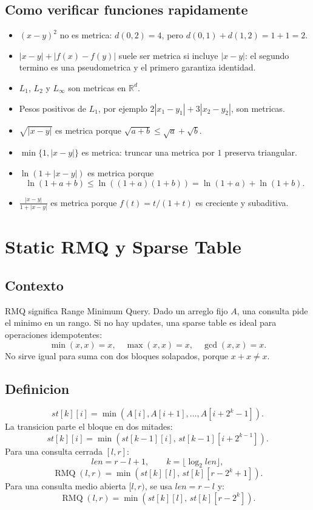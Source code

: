 \documentclass[10pt]{article}
\newcommand{\RMQ}{\operatorname{RMQ}}
\begin{document}
\subsection{Como verificar funciones rapidamente}
\begin{itemize}
\item \((x-y)^2\) no es metrica: \(d(0,2)=4\), pero \(d(0,1)+d(1,2)=1+1=2\).
\item \(|x-y|+|f(x)-f(y)|\) suele ser metrica si incluye \(|x-y|\): el segundo termino es una pseudometrica y
el primero garantiza identidad.
\item \(L_1\), \(L_2\) y \(L_\infty\) son metricas en \(\mathbb{R}^d\).
\item Pesos positivos de \(L_1\), por ejemplo \(2|x_1-y_1|+3|x_2-y_2|\), son metricas.
\item \(\sqrt{|x-y|}\) es metrica porque \(\sqrt{a+b}\le \sqrt a+\sqrt b\).
\item \(\min\{1,|x-y|\}\) es metrica: truncar una metrica por \(1\) preserva triangular.
\item \(\ln(1+|x-y|)\) es metrica porque
\[
\ln(1+a+b)\le \ln((1+a)(1+b))=\ln(1+a)+\ln(1+b).
\]
\item \(\frac{|x-y|}{1+|x-y|}\) es metrica porque \(f(t)=t/(1+t)\) es creciente y subaditiva.
\end{itemize}

\newpage

\section{Static RMQ y Sparse Table}

\subsection{Contexto}
RMQ significa Range Minimum Query. Dado un arreglo fijo \(A\), una consulta pide el minimo en un rango.
Si no hay updates, una sparse table es ideal para operaciones idempotentes:
\[
\min(x,x)=x,\quad \max(x,x)=x,\quad \gcd(x,x)=x.
\]
No sirve igual para suma con dos bloques solapados, porque \(x+x\neq x\).

\subsection{Definicion}
\[
st[k][i]=\min(A[i],A[i+1],\ldots,A[i+2^k-1]).
\]
La transicion parte el bloque en dos mitades:
\[
st[k][i]=\min(st[k-1][i],\,st[k-1][i+2^{k-1}]).
\]
Para una consulta cerrada \([l,r]\):
\[
len=r-l+1,\qquad k=\lfloor \log_2 len\rfloor,
\]
\[
\RMQ(l,r)=\min(st[k][l],\,st[k][r-2^k+1]).
\]
Para una consulta medio abierta \([l,r)\), se usa \(len=r-l\) y:
\[
\RMQ(l,r)=\min(st[k][l],\,st[k][r-2^k]).
\]
\end{document}
